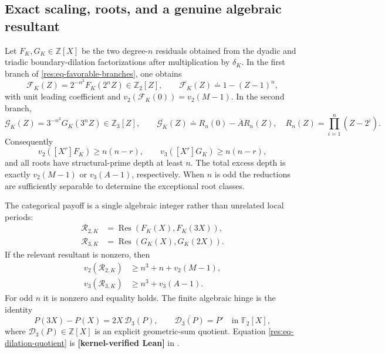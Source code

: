 \documentclass[11pt,oneside]{article}
\theoremstyle{definition}
\theoremstyle{remark}
\newcommand{\Z}{\mathbb Z}
\newcommand{\lean}[1]{\texttt{\detokenize{#1}}}
\newcommand{\statuslean}{\textcolor{leanblue}{\textbf{[kernel-verified Lean]}}}
\begin{document}
\subsection{Exact scaling, roots, and a genuine algebraic resultant}
\label{res:scaled-resultants}

Let $F_K,G_K\in\Z[X]$ be the two degree-$n$ residuals obtained from the dyadic and triadic
boundary-dilation factorizations after multiplication by $\delta_K$.  In the first branch of
\eqref{res:eq-favorable-branches}, one obtains
\begin{equation}
 \mathcal F_K(Z)=2^{-n^2}F_K(2^nZ)\in\Z_2[Z],
 \qquad
 \overline{\mathcal F_K}(Z)\doteq1-(Z-1)^n,
 \label{res:eq-dyadic-scaling}
\end{equation}
with unit leading coefficient and
$v_2(\mathcal F_K(0))=v_2(M-1)$.  In the second branch,
\begin{equation}
 \mathcal G_K(Z)=3^{-n^2}G_K(3^nZ)\in\Z_3[Z],
 \qquad
 \overline{\mathcal G_K}(Z)\doteq R_n(0)-\overline A R_n(Z),
 \quad R_n(Z)=\prod_{i=1}^n(Z-2^i).
 \label{res:eq-triadic-scaling}
\end{equation}
Consequently
\[
 v_2([X^r]F_K)\ge n(n-r),\qquad
 v_3([X^r]G_K)\ge n(n-r),
\]
and all roots have structural-prime depth at least $n$.  The total excess depth is exactly
$v_2(M-1)$ or $v_3(A-1)$, respectively.  When $n$ is odd the reductions are sufficiently
separable to determine the exceptional root classes.

The categorical payoff is a single algebraic integer rather than unrelated local periods:
\begin{align}
 \mathcal R_{2,K}&=\operatorname{Res}(F_K(X),F_K(3X)),\\
 \mathcal R_{3,K}&=\operatorname{Res}(G_K(X),G_K(2X)).
\end{align}
If the relevant resultant is nonzero, then
\begin{align}
 v_2(\mathcal R_{2,K})&\ge n^3+n+v_2(M-1),\\
 v_3(\mathcal R_{3,K})&\ge n^3+v_3(A-1).
 \label{res:eq-resultant-depths}
\end{align}
For odd $n$ it is nonzero and equality holds.  The finite algebraic hinge is the identity
\begin{equation}
 P(3X)-P(X)=2X\,\mathcal D_3(P),\qquad
 \overline{\mathcal D_3(P)}=\overline P'\quad\text{in }\mathbb F_2[X],
 \label{res:eq-dilation-quotient}
\end{equation}
where $\mathcal D_3(P)\in\Z[X]$ is an explicit geometric-sum quotient.  Equation
\eqref{res:eq-dilation-quotient} is \statuslean{} in
\lean{DilationDifferenceQuotient}.
\end{document}
